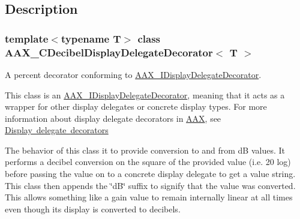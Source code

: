 \subsection{Description}
\subsubsection*{template$<$typename T$>$\newline
class A\+A\+X\+\_\+\+C\+Decibel\+Display\+Delegate\+Decorator$<$ T $>$}

A percent decorator conforming to \mbox{\hyperlink{a01805}{A\+A\+X\+\_\+\+I\+Display\+Delegate\+Decorator}}. 

This class is an \mbox{\hyperlink{a01805}{A\+A\+X\+\_\+\+I\+Display\+Delegate\+Decorator}}, meaning that it acts as a wrapper for other display delegates or concrete display types. For more information about display delegate decorators in \mbox{\hyperlink{a00852}{A\+AX}}, see \mbox{\hyperlink{a00816_displaydelegates_decorators}{Display delegate decorators}}

The behavior of this class it to provide conversion to and from dB values. It performs a decibel conversion on the square of the provided value (i.\+e. 20 log) before passing the value on to a concrete display delegate to get a value string. This class then appends the \char`\"{}d\+B\char`\"{} suffix to signify that the value was converted. This allows something like a gain value to remain internally linear at all times even though its display is converted to decibels.

